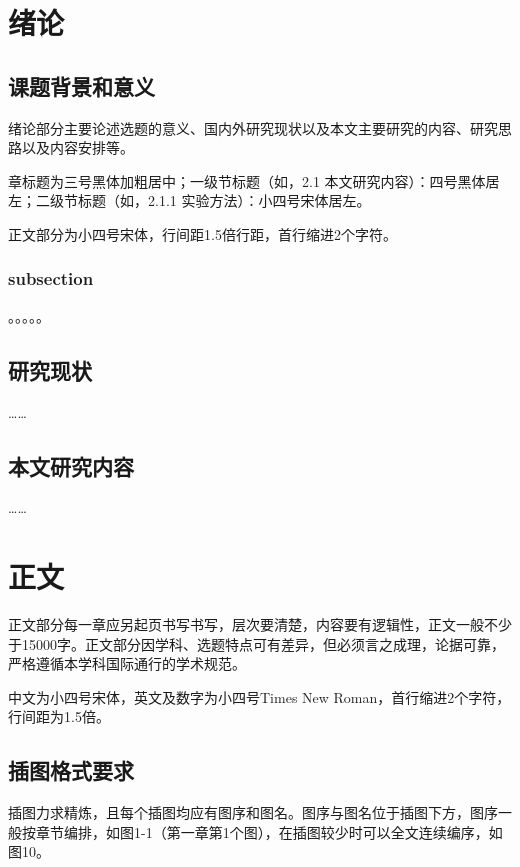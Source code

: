 \documentclass[bachelor,nocolorlinks, printoneside]{seuthesis} %
\begin{document}
\begin{Main} %

\chapter{绪论}

\section{课题背景和意义}

绪论部分主要论述选题的意义、国内外研究现状以及本文主要研究的内容、研究思路以及内容安排等。

章标题为三号黑体加粗居中；一级节标题（如，2.1 本文研究内容）：四号黑体居左；二级节标题（如，2.1.1 实验方法）：小四号宋体居左。

正文部分为小四号宋体，行间距1.5倍行距，首行缩进2个字符。

\subsection{subsection}
。。。。。

\section{研究现状}
……

\section{本文研究内容}
……

\chapter{正文}

正文部分每一章应另起页书写书写，层次要清楚，内容要有逻辑性，正文一般不少于15000字。正文部分因学科、选题特点可有差异，但必须言之成理，论据可靠，严格遵循本学科国际通行的学术规范。

中文为小四号宋体，英文及数字为小四号Times New Roman，首行缩进2个字符，行间距为1.5倍。

\section{插图格式要求}

插图力求精炼，且每个插图均应有图序和图名。图序与图名位于插图下方，图序一般按章节编排，如图1-1（第一章第1个图），在插图较少时可以全文连续编序，如图10。


\end{Main}
\end{document}
